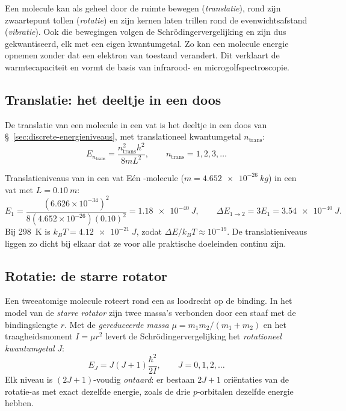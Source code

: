 Een molecule kan als geheel door de ruimte bewegen (\emph{translatie}), rond zijn zwaartepunt tollen (\emph{rotatie}) en zijn kernen laten trillen rond de evenwichtsafstand (\emph{vibratie}). Ook die bewegingen volgen de Schr\"odingervergelijking en zijn dus gekwantiseerd, elk met een eigen kwantumgetal. Zo kan een molecule energie opnemen zonder dat een elektron van toestand verandert. Dit verklaart de warmtecapaciteit en vormt de basis van infrarood- en microgolfspectroscopie.

\subsection{Translatie: het deeltje in een doos}
\label{sec:translatie}

De translatie van een molecule in een vat is het deeltje in een doos van \S~\ref{sec:discrete-energieniveaus}, met translationeel kwantumgetal $n_{\mathrm{trans}}$:
\begin{equation}
\boxed{
E_{n_{\mathrm{trans}}} = \frac{n_{\mathrm{trans}}^2 h^2}{8mL^2}, \qquad n_{\mathrm{trans}}=1,2,3,\ldots
}
\end{equation}

\begin{voorbeeld}{Translatieniveaus van  in een vat}
Eén -molecule ($m=\SI{4.652e-26}{kg}$) in een vat met $L=\SI{0.10}{m}$:
\[
E_1 = \frac{(6.626\times10^{-34})^2}{8(4.652\times10^{-26})(0.10)^2} = \SI{1.18e-40}{J}, \qquad \Delta E_{1\to2} = 3E_1 = \SI{3.54e-40}{J}.
\]
Bij \SI{298}{K} is $k_BT = \SI{4.12e-21}{J}$, zodat $\Delta E/k_BT \approx 10^{-19}$. De translatieniveaus liggen zo dicht bij elkaar dat ze voor alle praktische doeleinden continu zijn.
\end{voorbeeld}

\subsection{Rotatie: de starre rotator}
\label{sec:rotatie}

Een tweeatomige molecule roteert rond een as loodrecht op de binding. In het model van de \emph{starre rotator} zijn twee massa's verbonden door een staaf met de bindingslengte $r$. Met de \emph{gereduceerde massa} $\mu = m_1 m_2/(m_1+m_2)$ en het traagheidsmoment $I = \mu r^2$ levert de Schr\"odingervergelijking het \emph{rotationeel kwantumgetal} $J$:
\begin{equation}
\boxed{
E_J = J(J+1)\frac{\hbar^2}{2I}, \qquad J=0,1,2,\ldots
}
\end{equation}
Elk niveau is $(2J+1)$-voudig \emph{ontaard}: er bestaan $2J+1$ oriëntaties van de rotatie-as met exact dezelfde energie, zoals de drie $p$-orbitalen dezelfde energie hebben.

